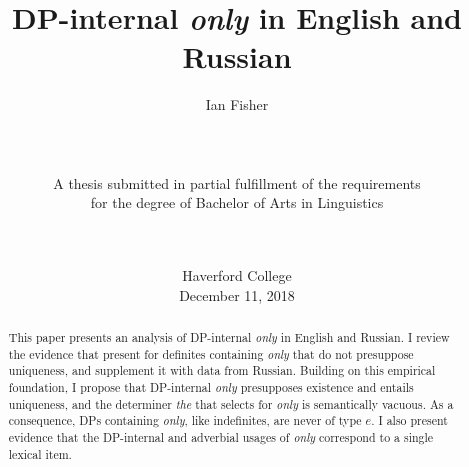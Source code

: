 \documentclass{article}
\title{DP-internal \textit{only} in English and Russian}
\author{Ian Fisher \\ \\ \\ \\ A thesis submitted in partial fulfillment of the requirements \\ for the degree of Bachelor of Arts in Linguistics \\ \\ \\}  %
\date{Haverford College \\ December 11, 2018}
\begin{document}
\maketitle

\begin{abstract}
This paper presents an analysis of DP-internal \textit{only} in English and Russian. I review the evidence that \citet{cb2012b, cb2015} present for definites containing \textit{only} that do not presuppose uniqueness, and supplement it with data from Russian. Building on this empirical foundation, I propose that DP-internal \textit{only} presupposes existence and entails uniqueness, and the determiner \textit{the} that selects for \textit{only} is semantically vacuous. As a consequence, DPs containing \textit{only}, like indefinites, are never of type $e$. I also present evidence that the DP-internal and adverbial usages of \textit{only} correspond to a single lexical item.
\end{abstract}

\newpage












\end{document}
